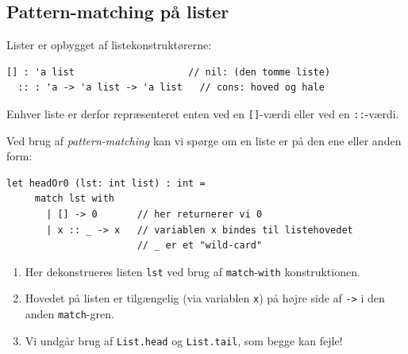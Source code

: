 \documentclass[rgb]{beamer}
\begin{document}
\popmaketitleframe

\subsection{Pattern-matching på lister}

\begin{frame}[fragile]
\begin{footnotesize}

  Lister er opbygget af listekonstruktørerne:
\begin{lstlisting}[numbers=none,frame=none,mathescape]
  [] : 'a list                    // nil: (den tomme liste)
  :: : 'a -> 'a list -> 'a list   // cons: hoved og hale
\end{lstlisting}

  Enhver liste er derfor repræsenteret enten ved en
  \lstinline{[]}-værdi eller ved en \lstinline{::}-værdi.


  Ved brug af \emph{pattern-matching} kan vi spørge om en liste er på
  den ene eller anden form:

 \begin{lstlisting}[numbers=none,frame=none,mathescape]
   let headOr0 (lst: int list) : int =
     match lst with
       | [] -> 0       // her returnerer vi 0
       | x :: _ -> x   // variablen x bindes til listehovedet
                       // _ er et "wild-card"
 \end{lstlisting}

 \vspace{-7mm}
  \begin{enumerate}
  \item Her dekonstrueres listen \lstinline{lst} ved brug af \lstinline{match}-\lstinline{with} konstruktionen.
  \item Hovedet på listen er tilgængelig (via variablen \lstinline{x}) på højre side af \lstinline{->} i den anden \lstinline{match}-gren.
  \item Vi undgår brug af \lstinline{List.head} og \lstinline{List.tail}, som begge kan fejle!
  \end{enumerate}
\end{footnotesize}
\end{frame}

\end{document}
